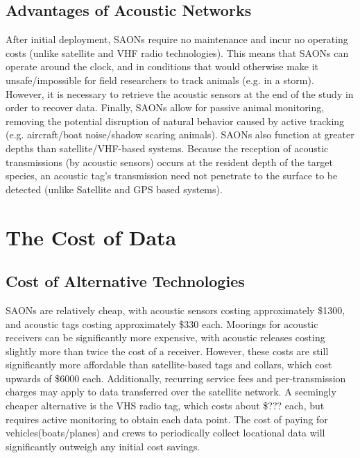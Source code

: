 \subsection{Advantages of Acoustic Networks}
After initial deployment, SAONs require no maintenance and incur no operating costs (unlike satellite and VHF radio technologies).  This means that SAONs can operate around the clock, and in conditions that would otherwise make it unsafe/impossible for field researchers to track animals (e.g. in a storm)\cite{Heupel2006}.  However, it is necessary to retrieve the acoustic sensors at the end of the study in order to recover data\cite{Heupel2006}.  Finally, SAONs allow for passive animal monitoring, removing the potential disruption of natural behavior caused by active tracking (e.g. aircraft/boat noise/shadow scaring animals)\cite{Heupel2006}.  SAONs also function at greater depths than satellite/VHF-based systems.  Because the reception of acoustic transmissions (by acoustic sensors) occurs at the resident depth of the target species, an acoustic tag's transmission need not penetrate to the surface to be detected (unlike Satellite and GPS based systems).




\section{The Cost of Data}
\subsection{Cost of Alternative Technologies}
SAONs are relatively cheap, with acoustic sensors costing approximately \$1300, and acoustic tags costing approximately \$330 each.  Moorings for acoustic receivers can be significantly more expensive, with acoustic releases costing slightly more than twice the cost of a receiver.  However, these costs are still significantly more affordable than satellite-based tags and collars, which cost upwards of \$6000 each.  Additionally, recurring service fees and per-transmission charges may apply to data transferred over the satellite network.  A seemingly cheaper alternative is the VHS radio tag, which costs about \$??? each, but requires active monitoring to obtain each data point.  The cost of paying for vehicles(boats/planes) and crews to periodically collect locational data will significantly outweigh any initial cost savings.


